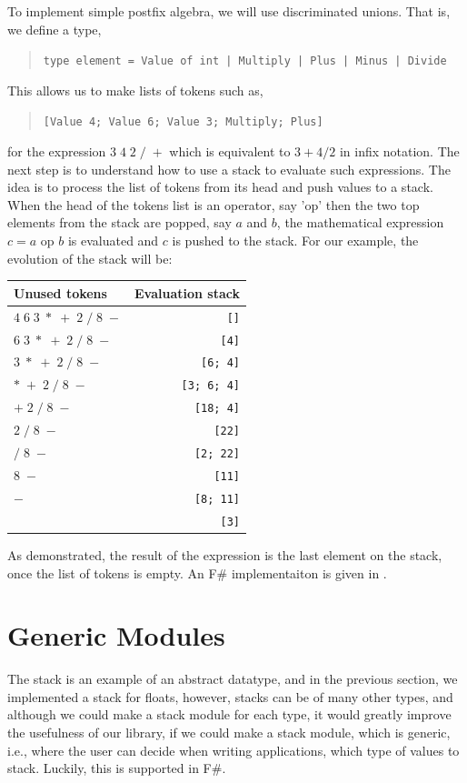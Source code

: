 \documentclass[fsharpNotes.tex]{subfiles}
\begin{document}
To implement simple postfix algebra, we will use discriminated unions. That is, we define a type,
\begin{quote}
\lstinline{type element = Value of int | Multiply | Plus | Minus | Divide}
\end{quote}
This allows us to make lists of tokens such as,
\begin{quote}
\lstinline{[Value 4; Value 6; Value 3; Multiply; Plus]}
\end{quote}
for the expression $3\; 4\; 2\; /\; +$ which is equivalent to $3+4/2$ in infix notation. The next step is to understand how to use a stack to evaluate such expressions. The idea is to process the list of tokens from its head and push values to a stack. When the head of the tokens list is an operator, say 'op' then the two top elements from the stack are popped, say $a$ and $b$, the mathematical expression $c = a\text{ op }b$ is evaluated and $c$ is pushed to the stack. For our example, the evolution of the stack will be:
\begin{center}
  \begin{tabular}{l|r}
  Unused tokens &  Evaluation stack\\\hline
  $4\; 6\; 3\; *\; +\; 2\; /\; 8\; -$ & \lstinline![]! \\
  $6\; 3\; *\; +\; 2\; /\; 8\; -$ & \lstinline![4]! \\
  $3\; *\; +\; 2\; /\; 8\; -$ & \lstinline![6; 4]! \\
  $*\; +\; 2\; /\; 8\; -$ & \lstinline![3; 6; 4]! \\
  $+\; 2\; /\; 8\; -$ & \lstinline![18; 4]! \\
  $2\; /\; 8\; -$ & \lstinline![22]! \\
  $/\; 8\; -$ & \lstinline![2; 22]! \\
  $8\; -$ & \lstinline![11]! \\
  $-$ & \lstinline![8; 11]! \\
   & \lstinline![3]! \\
\end{tabular}
\end{center}
As demonstrated, the result of the expression is the last element on the stack, once the list of tokens is empty. An F\# implementaiton is given in .

\section{Generic Modules}
\label{sec:genericModule}
The stack is an example of an abstract datatype, and in the previous section, we implemented a stack for floats, however, stacks can be of many other types, and although we could make a stack module for each type, it would greatly improve the usefulness of our library, if we could make a stack module, which is generic, i.e., where the user can decide when writing applications, which type of values to stack. Luckily, this is supported in F\#.
\end{document}

